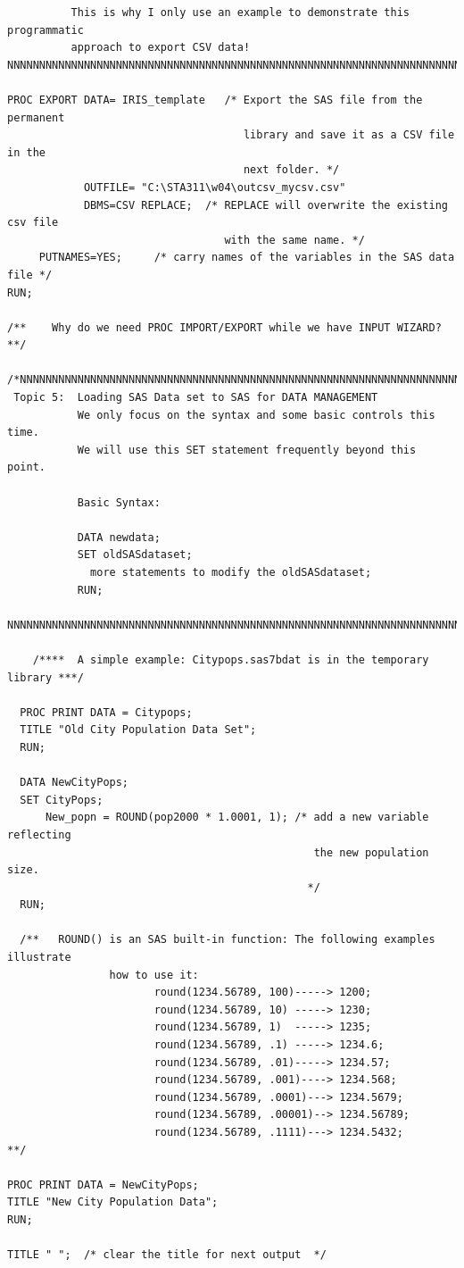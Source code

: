 \documentclass[
]{book}
\begin{document}
\begin{verbatim}
          This is why I only use an example to demonstrate this programmatic
          approach to export CSV data!
NNNNNNNNNNNNNNNNNNNNNNNNNNNNNNNNNNNNNNNNNNNNNNNNNNNNNNNNNNNNNNNNNNNNNNNNNNNN*/

PROC EXPORT DATA= IRIS_template   /* Export the SAS file from the permanent 
                                     library and save it as a CSV file in the 
                                     next folder. */
            OUTFILE= "C:\STA311\w04\outcsv_mycsv.csv" 
            DBMS=CSV REPLACE;  /* REPLACE will overwrite the existing csv file 
                                  with the same name. */
     PUTNAMES=YES;     /* carry names of the variables in the SAS data file */
RUN;

/**    Why do we need PROC IMPORT/EXPORT while we have INPUT WIZARD?    **/

/*NNNNNNNNNNNNNNNNNNNNNNNNNNNNNNNNNNNNNNNNNNNNNNNNNNNNNNNNNNNNNNNNNNNNNNNNNNNNNN
 Topic 5:  Loading SAS Data set to SAS for DATA MANAGEMENT
           We only focus on the syntax and some basic controls this time.
           We will use this SET statement frequently beyond this point.
  
           Basic Syntax:

           DATA newdata;
           SET oldSASdataset;
             more statements to modify the oldSASdataset;
           RUN;
           
NNNNNNNNNNNNNNNNNNNNNNNNNNNNNNNNNNNNNNNNNNNNNNNNNNNNNNNNNNNNNNNNNNNNNNNNNNNNN*/

    /****  A simple example: Citypops.sas7bdat is in the temporary library ***/

  PROC PRINT DATA = Citypops;
  TITLE "Old City Population Data Set";
  RUN;

  DATA NewCityPops;
  SET CityPops;
      New_popn = ROUND(pop2000 * 1.0001, 1); /* add a new variable reflecting
                                                the new population size. 
                                               */
  RUN;

  /**   ROUND() is an SAS built-in function: The following examples illustrate 
                how to use it:
                       round(1234.56789, 100)-----> 1200; 
                       round(1234.56789, 10) -----> 1230; 
                       round(1234.56789, 1)  -----> 1235; 
                       round(1234.56789, .1) -----> 1234.6;
                       round(1234.56789, .01)-----> 1234.57; 
                       round(1234.56789, .001)----> 1234.568;  
                       round(1234.56789, .0001)---> 1234.5679; 
                       round(1234.56789, .00001)--> 1234.56789;
                       round(1234.56789, .1111)---> 1234.5432;        **/

PROC PRINT DATA = NewCityPops;
TITLE "New City Population Data";
RUN;

TITLE " ";  /* clear the title for next output  */
\end{verbatim}
\end{document}
